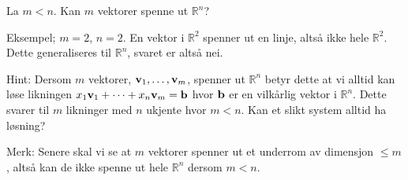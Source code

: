 \begin{oppgave}
	La $m<n$. Kan $m$ vektorer spenne ut $\mathbb{R}^n$? 
\end{oppgave}

\begin{losning}
Eksempel; $m=2$, $n=2$. En vektor i $\mathbb{R}^2$ spenner ut en linje, altså ikke hele $\mathbb{R}^2$. Dette generaliseres til $\mathbb{R}^n$, svaret er altså nei.

\noindent
Hint: Dersom $m$ vektorer, $\mathbf{v}_1,\dots,\mathbf{v}_m$, spenner ut $\mathbb{R}^n$ betyr dette at vi alltid kan løse likningen $x_1\mathbf{v}_1+\dots+x_n\mathbf{v}_m=\mathbf{b}$ hvor $\mathbf{b}$ er en vilkårlig vektor i $\mathbb{R}^n$. Dette svarer til $m$ likninger med $n$ ukjente hvor $m<n$. Kan et slikt system alltid ha løsning?

\noindent
Merk: Senere skal vi se at $m$ vektorer spenner ut et underrom av dimensjon $\leq m$, altså kan de ikke spenne ut hele $\mathbb{R}^n$ dersom $m<n$.
\end{losning}





